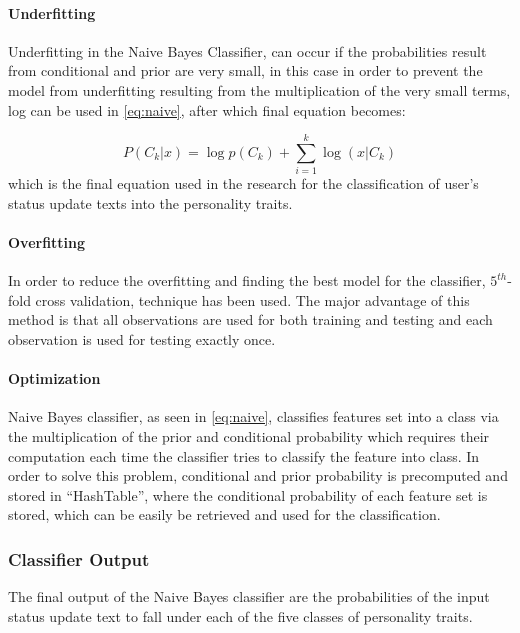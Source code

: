 \documentclass[conference]{IEEEtran}
\begin{document}
\paragraph{Underfitting}

Underfitting in the Naive Bayes Classifier, can occur if the probabilities result from conditional and prior are very small, in this case in order to prevent the model from underfitting resulting from the multiplication of the very small terms, log can be used in \ref{eq:naive}, after which final equation becomes:

\begin{equation}
P(C_k|x) = \log p(C_k) + \sum_{i=1}^{k} \log(x|C_k)
\end{equation}
which is the final equation used in the research for the classification of user's status update texts into the personality traits.

\paragraph{Overfitting}

In order to reduce the overfitting and finding the best model for the classifier, $5^{th}$-fold cross validation, technique has been used. The major advantage of this method is that all observations are used for both training and testing and each observation is used for testing exactly once.

\paragraph{Optimization}

Naive Bayes classifier, as seen in \ref{eq:naive}, classifies features set into a class via the multiplication of the prior and conditional probability which requires their computation each time the classifier tries to classify the feature into class. In order to solve this problem, conditional and prior probability is precomputed and stored in ``HashTable'', where the conditional probability of each feature set is stored, which can be easily be retrieved and used for the classification.

\subsubsection{Classifier Output}
The final output of the Naive Bayes classifier are the probabilities of the input status update text to fall under each of the five classes of personality traits.
\end{document}
